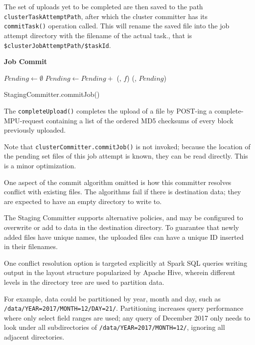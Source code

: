\documentclass[conference]{IEEEtran}
\begin{document}
The set of uploads yet to be completed are then saved to the path
\texttt{clusterTaskAttemptPath}, after which the cluster committer has
its \texttt{commitTask()} operation called.
This will rename the saved file into the job attempt directory with the
filename of the actual task., that is \texttt{\$clusterJobAttemptPath/\$taskId}.


\textbf{Job Commit}

\begin{procedure}
  \StagingVars
  $Pending \longleftarrow \emptyset$\;
   {
    $Pending \longleftarrow Pending + $ \loadPendingSet(\clusterfs, $f$)\;
  }
  \checkForConflicts(\fs, $Pending$)

  \caption{StagingCommitter.commitJob()}
  \label{alg:StagingCommitter.commitJob}
\end{procedure}

The \texttt{completeUpload()} completes the upload of a file by POST-ing
a complete-MPU-request containing a list of the ordered MD5 checksums of every block
previously uploaded.

Note that \texttt{clusterCommitter.commitJob()} is not invoked;
because the location of the pending set files of this job attempt is known,
they can be read directly.
This is a minor optimization.

One aspect of the commit algorithm omitted is how this committer resolves
conflict with existing files.
The \FileOutputCommitter algorithms fail if there is destination data;
they are expected to have an empty directory to write to.

The Staging Committer supports alternative policies, and may be configured
to overwrite or add to data in the destination directory.
To guarantee that newly added files have unique names, the
uploaded files can have a unique ID inserted in their filenames.

One conflict resolution option is targeted explicitly at Spark SQL queries writing
output in the layout structure popularized by Apache Hive, wherein
different levels in the directory tree are used to partition data.

For example, data could be partitioned by year, month and day, such as
\texttt{/data/YEAR=2017/MONTH=12/DAY=21/}.
Partitioning increases query performance where only select field ranges are used;
any query of December 2017 only needs to look under all subdirectories of
\texttt{/data/YEAR=2017/MONTH=12/}, ignoring all adjacent directories.
\end{document}

